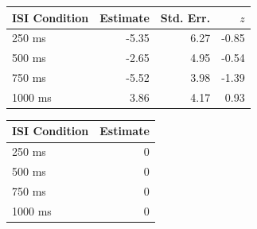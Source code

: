 \documentclass[man,floatsintext]{apa6}
\theoremstyle{definition}
\theoremstyle{definition}
\theoremstyle{definition}
\theoremstyle{remark}
\begin{document}
\begin{appendix}
\begin{table}[!p]
\begin{subtable}{\textwidth}
\begin{table}[H]
\begin{tabular}{lrrr}
\toprule
ISI Condition & Estimate & Std. Err. & $z$\\
\midrule
250  ms & -5.35 & 6.27 & -0.85\\
500  ms & -2.65 & 4.95 & -0.54\\
750  ms & -5.52 & 3.98 & -1.39\\
1000 ms & 3.86 & 4.17 & 0.93\\
\bottomrule
\end{tabular}\endgroup{}
\end{table}
\end{subtable}
\begin{subtable}{\textwidth}
\caption{Variance Component Estimates. Estimates are presented on the standard deviation scale. }
\centering
\begin{table}[H]\centering\begingroup\fontsize{10}{12}\selectfont

\begin{tabular}{lr}
\toprule
ISI Condition & Estimate\\
\midrule
250 ms & 0\\
500 ms & 0\\
750 ms & 0\\
1000 ms & 0\\
\bottomrule
\end{tabular}\endgroup{}
\end{table}
\end{subtable}
\end{table}
\end{appendix}
\end{document}
